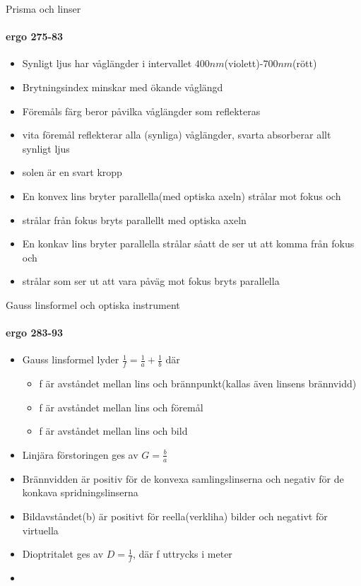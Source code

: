 \documentclass{beamer}
\begin{document}
\begin{frame}{Prisma och linser}
\framesubtitle{ergo 275-83}

  \begin{itemize}
    \item Synligt ljus har v\aa gl\"angder i intervallet $400 nm$(violett)-$700 nm$(r\"ott)
    \item Brytningsindex minskar med \"okande v\aa gl\"angd
    \item F\"orem\aa ls f\"arg beror p\aa vilka v\aa gl\"angder som reflekteras
    \item vita f\"orem\aa l reflekterar alla (synliga) v\aa gl\"angder, svarta absorberar allt synligt ljus
    \item solen \"ar en svart kropp
    \item En \alert{konvex lins} bryter parallella(med optiska axeln) str\aa lar mot fokus och
    \item str\aa lar fr\aa n fokus bryts parallellt med optiska axeln
    \item En \alert{konkav lins} bryter parallella str\aa lar s\aa att de ser ut att komma fr\aa n fokus och 
    \item str\aa lar som ser ut att vara p\aa v\"ag mot fokus bryts parallella

  \end{itemize}


\end{frame}




\begin{frame}{Gauss linsformel och optiska instrument}
\framesubtitle{ergo 283-93}

  \begin{itemize}
    \item \alert{Gauss linsformel} lyder $\frac{1}{f}=\frac{1}{a}+\frac{1}{b}$
    d\"ar 
\begin{itemize}
\item f \"ar avst\aa ndet mellan lins och br\"annpunkt(kallas \"aven linsens br\"annvidd)
\item f \"ar avst\aa ndet mellan lins och f\"orem\aa l
\item f \"ar avst\aa ndet mellan lins och bild
\end{itemize}
    \item \alert{Linj\"ara f\"orstoringen } ges av $G=\frac{b}{a}$
    \item Br\"annvidden \"ar positiv f\"or de konvexa samlingslinserna och negativ f\"or de konkava spridningslinserna
    \item Bildavst\aa ndet(b) \"ar positivt f\"or reella(verkliha) bilder och negativt f\"or virtuella
    \item \alert{Dioptritalet} ges av $D=\frac{1}{f}$, d\"ar f uttrycks i meter
    \item 
  \end{itemize}



\end{frame}
\end{document}
